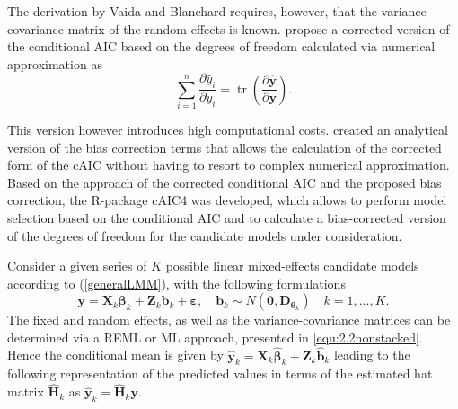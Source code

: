 The derivation by Vaida and Blanchard requires, however, that the variance-covariance matrix of the random effects is known.
\cite{Liang.2008} propose a corrected version of the conditional AIC based on the degrees of freedom calculated via numerical approximation as
\begin{equation*}
    \label{liangCorrection}
    \sum_{i=1}^{n} \frac{\partial \hat{  y}_{i}}{\partial   y_{i}}=\operatorname{tr}\left(\frac{\partial \hat{ \boldsymbol y}}{\partial  \boldsymbol y}\right).
\end{equation*}

This version however introduces high computational costs. \cite{Greven.2010} created an analytical version of the bias correction terms that allows the calculation of the corrected form of the cAIC without having to resort to complex numerical approximation.
Based on the approach of the corrected conditional AIC and the proposed bias correction, the R-package cAIC4 \citep{Safken.2018} was developed, which allows to perform model selection based on the conditional AIC and to calculate a bias-corrected version of the  degrees of freedom for the candidate models under consideration. 


Consider a given series of $K$ possible linear mixed-effects candidate models according to (\ref{generalLMM}), with the following formulations 
\begin{equation*}
 \boldsymbol y= \boldsymbol X_{k}  \boldsymbol \beta_{k}+ \boldsymbol Z_{k}  \boldsymbol b_{k}+ \boldsymbol \varepsilon,  \quad  \boldsymbol b_{k} \sim N\left( \boldsymbol 0,  \boldsymbol D_{\boldsymbol\theta}_{k}\right) \quad k=1, \ldots, K.
\end{equation*}
The fixed and random effects, as well as the variance-covariance matrices can be determined via a REML or ML approach, presented in \ref{equ:2.2nonstacked}. %
Hence the conditional mean is given by $\hat{ \boldsymbol y}_{k}=\boldsymbol{X}_{k} \hat{ \boldsymbol \beta}_{k}+ \boldsymbol Z_{k} \hat{ \boldsymbol b}_{k}$ leading to the following representation of the predicted values in terms of the estimated hat matrix $\hat{ \boldsymbol H}_{k}$ as $\hat{\boldsymbol y}_{k}=\hat{\boldsymbol H}_{k} \boldsymbol y$. 

